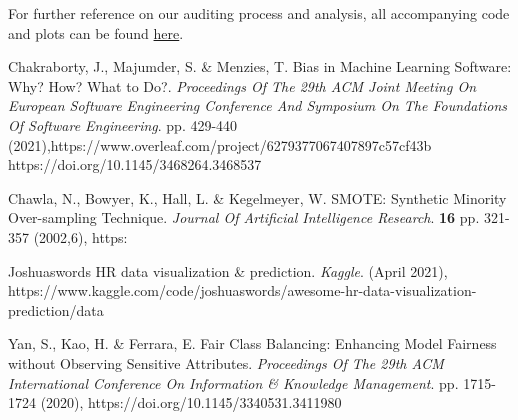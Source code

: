 For further reference on our auditing process and analysis, all accompanying code and plots can be found \href{https://github.com/cas2247/RDS_Algorithmic_Fairness}{here}.


\begin{thebibliography}{9}


%

Chakraborty, J., Majumder, S. \& Menzies, T. Bias in Machine Learning Software: Why? How? What to Do?. {\em Proceedings Of The 29th ACM Joint Meeting On European Software Engineering Conference And Symposium On The Foundations Of Software Engineering}. pp. 429-440 (2021),https://www.overleaf.com/project/6279377067407897c57cf43b https://doi.org/10.1145/3468264.3468537


Chawla, N., Bowyer, K., Hall, L. \& Kegelmeyer, W. SMOTE: Synthetic Minority Over-sampling Technique. {\em Journal Of Artificial Intelligence Research}. \textbf{16} pp. 321-357 (2002,6), https:%

Joshuaswords HR data visualization \& prediction. {\em Kaggle}. (April 2021), https://www.kaggle.com/code/joshuaswords/awesome-hr-data-visualization-prediction/data

Yan, S., Kao, H. \& Ferrara, E. Fair Class Balancing: Enhancing Model Fairness without Observing Sensitive Attributes. {\em Proceedings Of The 29th ACM International Conference On Information \& Knowledge Management}. pp. 1715-1724 (2020), https://doi.org/10.1145/3340531.3411980

\end{thebibliography}



\pagebreak
